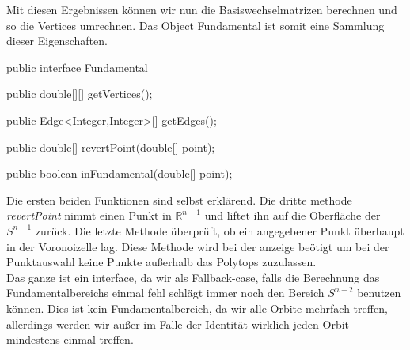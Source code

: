          Mit diesen Ergebnissen können wir nun die Basiswechselmatrizen berechnen und so die Vertices umrechnen. Das Object Fundamental ist somit
         eine Sammlung dieser Eigenschaften.

         \begin{code}
            public interface Fundamental {
               public double[][] getVertices();
               
               public Edge<Integer,Integer>[] getEdges();

               public double[] revertPoint(double[] point);

               public boolean inFundamental(double[] point);
            }
         \end{code}
         
         Die ersten beiden Funktionen sind selbst erklärend. Die dritte methode \emph{revertPoint} nimmt einen Punkt in $\mathbb{R}^{n-1}$ und
         liftet ihn auf die Oberfläche der $S^{n-1}$ zurück. Die letzte Methode überprüft, ob ein angegebener Punkt überhaupt in der Voronoizelle lag.
         Diese Methode wird bei der anzeige beötigt um bei der Punktauswahl keine Punkte außerhalb das Polytops zuzulassen.\\

         Das ganze ist ein interface, da wir als Fallback-case, falls die Berechnung das Fundamentalbereichs einmal fehl schlägt immer noch 
         den Bereich $S^{n-2}$ benutzen können. Dies ist kein Fundamentalbereich, da wir alle Orbite mehrfach treffen, allerdings werden wir außer im Falle
         der Identität wirklich jeden Orbit mindestens einmal treffen.
